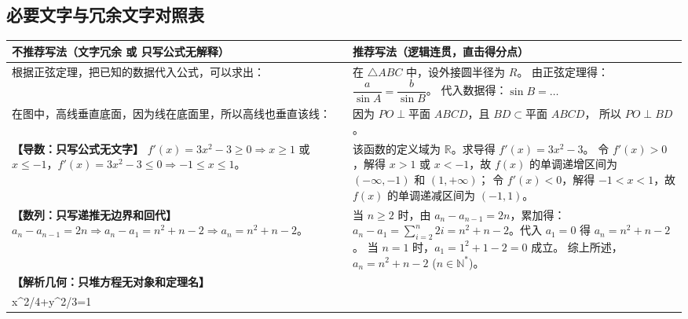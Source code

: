 \documentclass[11pt,a4paper]{ctexart}
\begin{document}
\subsection{必要文字与冗余文字对照表}
\begingroup
\renewcommand{\arraystretch}{1.4}
\begin{tabularx}{\textwidth}{p{6.0cm}|X}
\toprule
\textbf{不推荐写法（文字冗余 或 只写公式无解释）} & \textbf{推荐写法（逻辑连贯，直击得分点）} \\
\midrule
根据正弦定理，把已知的数据代入公式，可以求出： & 
在 \(\triangle ABC\) 中，设外接圆半径为 \(R\)。\newline
由正弦定理得：\(\dfrac{a}{\sin A} = \dfrac{b}{\sin B}\)。\newline
代入数据得：\(\sin B = \dots\) \\ \hline
在图中，高线垂直底面，因为线在底面里，所以高线也垂直该线： &
因为 \(PO \perp \text{平面 } ABCD\)，且 \(BD \subset \text{平面 } ABCD\)，\newline
所以 \(PO \perp BD\)。\\ \hline
\textbf{【导数：只写公式无文字】}\newline
\(f'(x) = 3x^2 - 3 \ge 0 \Rightarrow x \ge 1\) 或 \(x \le -1\)，\(f'(x) = 3x^2 - 3 \le 0 \Rightarrow -1 \le x \le 1\)。 &
该函数的定义域为 \(\mathbb{R}\)。求导得 \(f'(x) = 3x^2 - 3\)。\newline
令 \(f'(x) > 0\)，解得 \(x > 1\) 或 \(x < -1\)，故 \(f(x)\) 的单调递增区间为 \((-\infty, -1)\) 和 \((1, +\infty)\)；\newline
令 \(f'(x) < 0\)，解得 \(-1 < x < 1\)，故 \(f(x)\) 的单调递减区间为 \((-1, 1)\)。\\ \hline
\textbf{【数列：只写递推无边界和回代】}\newline
\(a_n - a_{n-1} = 2n \Rightarrow a_n - a_1 = n^2+n-2 \Rightarrow a_n = n^2+n-2\)。 &
当 \(n \ge 2\) 时，由 \(a_n - a_{n-1} = 2n\)，累加得：\newline
\(a_n - a_1 = \sum_{i=2}^n 2i = n^2 + n - 2\)。代入 \(a_1 = 0\) 得 \(a_n = n^2 + n - 2\)。\newline
当 \(n = 1\) 时，\(a_1 = 1^2 + 1 - 2 = 0\) 成立。\newline
综上所述，\(a_n = n^2 + n - 2\) (\(n \in \mathbb{N}^*\))。\\ \hline
\textbf{【解析几何：只堆方程无对象和定理名】}\newline
\(\begin{cases} y=kx+b \\ x^2/4+y^2/3=1 \end{cases} \Rightarrow (3+4k^2)x^2+8kbx+4b^2-12=0 \Rightarrow x_1+x_2 = -\frac{8kb}{3+4k^2}\)。 &

\end{tabularx}
\end{document}
